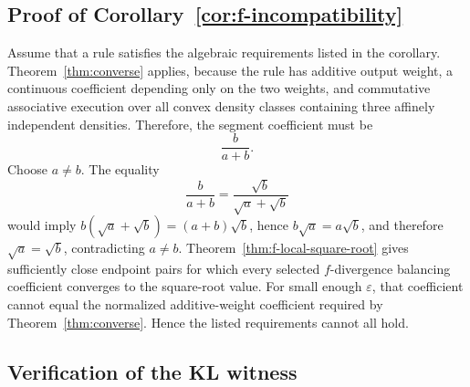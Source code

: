 \documentclass[runningheads]{llncs}
\begin{document}
\subsection*{Proof of Corollary~\ref{cor:f-incompatibility}}

Assume that a rule satisfies the algebraic requirements listed in the corollary. Theorem~\ref{thm:converse} applies, because the rule has additive output weight, a continuous coefficient depending only on the two weights, and commutative associative execution over all convex density classes containing three affinely independent densities. Therefore, the segment coefficient must be
\begin{equation*}
  \frac{b}{a+b}.
\end{equation*}
Choose $a\neq b$. The equality
\begin{equation*}
  \frac{b}{a+b}=\frac{\sqrt b}{\sqrt a+\sqrt b}
\end{equation*}
would imply $b(\sqrt a+\sqrt b)=(a+b)\sqrt b$, hence $b\sqrt a=a\sqrt b$, and therefore $\sqrt a=\sqrt b$, contradicting $a\neq b$. Theorem~\ref{thm:f-local-square-root} gives sufficiently close endpoint pairs for which every selected $f$-divergence balancing coefficient converges to the square-root value. For small enough $\varepsilon$, that coefficient cannot equal the normalized additive-weight coefficient required by Theorem~\ref{thm:converse}. Hence the listed requirements cannot all hold.


\subsection*{Verification of the KL witness}
\end{document}
